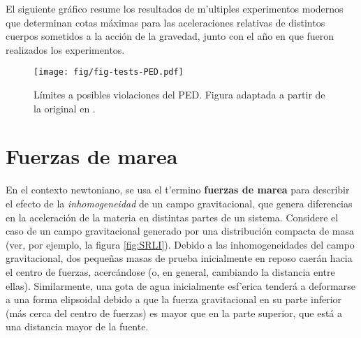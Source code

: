 El siguiente gráfico resume los resultados de m'ultiples experimentos modernos que determinan cotas máximas para las aceleraciones relativas de distintos cuerpos sometidos a la acción de la gravedad, junto con el a\~no en que fueron realizados los experimentos.
\begin{center}
\begin{figure}[H]
\centerline{\texttt{[image: fig/fig-tests-PED.pdf]}}
\caption{Límites a posibles violaciones del PED. Figura adaptada a partir de la original en \cite{Turyshev08}.}
\label{fig:equiv1}
\end{figure}
\end{center}

\section{Fuerzas de marea}
En el contexto newtoniano, se usa el t'ermino \textbf{fuerzas de marea} para describir el efecto de la \textit{inhomogeneidad} de un campo gravitacional, que genera diferencias en la aceleración de la materia en distintas partes de un sistema. Considere el caso de un campo gravitacional generado por una distribución compacta de masa (ver, por ejemplo, la figura \ref{fig:SRLI}). Debido a las inhomogeneidades del campo gravitacional, dos peque\~nas masas de prueba inicialmente en reposo caerán hacia el centro de fuerzas, acercándose (o, en general, cambiando la distancia entre ellas). Similarmente, una gota de agua inicialmente esf'erica tenderá a deformarse a una forma elipsoidal debido a que la fuerza gravitacional en su parte inferior (más cerca del centro de fuerzas) es mayor que en la parte superior, que está a una distancia mayor de la fuente.

